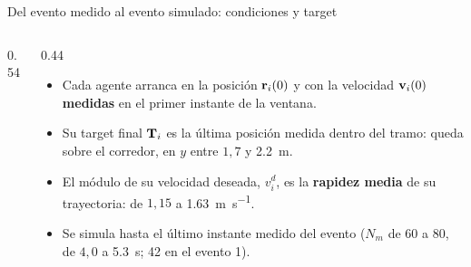 \documentclass[aspectratio=169,11pt]{beamer}
\begin{document}
\begin{frame}{Del evento medido al evento simulado: condiciones y target}
    \vspace{-0.2em}
    \begin{columns}[c,onlytextwidth]
        \begin{column}{0.54\textwidth}
            \centering
            \resizebox{\linewidth}{!}{}
        \end{column}\hfill
        \begin{column}{0.44\textwidth}
            \small
            \begin{itemize}\setlength{\itemsep}{0.55em}
                \item Cada agente arranca en la posición $\mathbf{r}_i(0)$ y con la
                      velocidad $\mathbf{v}_i(0)$ \textbf{medidas} en el primer
                      instante de la ventana.
                \item Su \alert{target final $\mathbf{T}_i$ es la última posición
                      medida} dentro del tramo: queda sobre el corredor, en
                      $y$ entre $1{,}7$ y \SI{2.2}{\meter}.
                \item El módulo de su velocidad deseada, $v_i^{d}$, es la
                      \textbf{rapidez media} de su trayectoria: de $1{,}15$ a
                      \SI{1.63}{\meter\per\second}.
                \item Se simula hasta el último instante medido del evento
                      ($N_m$ de 60 a 80, de $4{,}0$ a \SI{5.3}{\second}; 42 en
                      el evento 1).
            \end{itemize}
        \end{column}
    \end{columns}
\end{frame}
\end{document}

